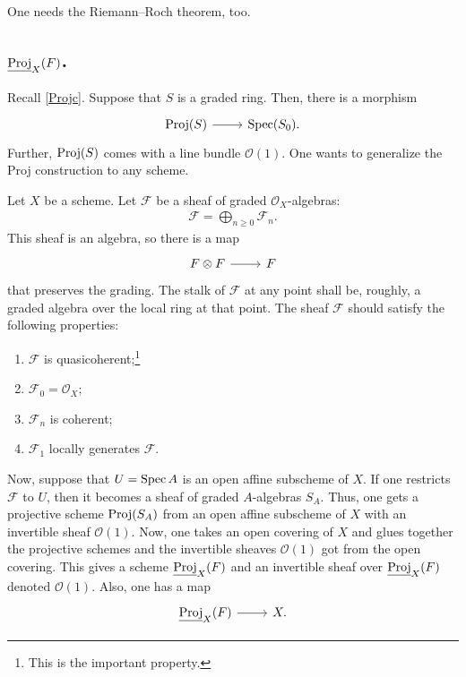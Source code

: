\documentclass [11 pt, oneside] {article}
\begin{document}
One needs the Riemann--Roch theorem, too.

\subsection{\texorpdfstring{$\underline{\operatorname{Proj}}_X(\relax{F})$}{Proj X (F)}.}
Recall \cref{Projc}. Suppose that $S$ is a graded ring. Then, there is a morphism
\[
\begin{tikzcd}
	\Proj(S)\ar[r]& \Spec (S_0).
\end{tikzcd}
\]
Further, $\operatorname{Proj}(S)$ comes with a line bundle $\mathscr{O}(1)$.
One wants to generalize the Proj construction to any scheme.

Let $X$ be a scheme. Let $\mathscr{F}$ be a sheaf of graded $\mathscr{O}_X$-algebras:
\begin{align*}
	\mathscr{F} = \bigoplus_{n\ge 0}^{} \mathscr{F}_n.
\end{align*}
This sheaf is an algebra, so there is a map
\[
\begin{tikzcd}
	\mathscr{F}\tensor \mathscr{F}\ar[r]&\mathscr{F}
\end{tikzcd}
\]
that preserves the grading.
The stalk of $\mathscr{F}$ at any point shall be, roughly, a graded algebra over the local ring at that point. The sheaf $\mathscr{F}$ should satisfy the following properties:
\begin{enumerate}
	\item $\mathscr{F}$ is quasicoherent;\footnote{This is the important property.}
	\item $\mathscr{F}_0 = \mathscr{O}_X$;
	\item $\mathscr{F}_n$ is coherent;
	\item $\mathscr{F}_1$ locally generates $\mathscr{F}$.
\end{enumerate}

Now, suppose that $U=\operatorname{Spec} A$ is an open affine subscheme of $X$. If one restricts $\mathscr{F}$ to $U$, then it becomes a sheaf of graded $A$-algebras $S_A$. Thus, one gets a projective scheme $\operatorname{Proj} (S_A)$ from an open affine subscheme of $X$ with an invertible sheaf $\mathscr{O}(1)$. 
Now, one takes an open covering of $X$ and glues together the projective schemes and the invertible sheaves $\mathscr{O}(1)$ got from the open covering. This gives a scheme $\underline{\operatorname{Proj}}_X(\relax{F})$ and an invertible sheaf over $\underline{\operatorname{Proj}}_X(\relax{F})$ denoted $\mathscr{O}(1)$. Also, one has a map
\[
\begin{tikzcd}
	\underline{\Proj}_X(\mathscr{F}) \ar[r]& X.
\end{tikzcd}
\]
\end{document}
